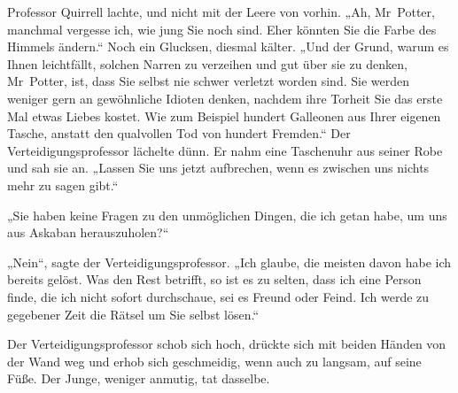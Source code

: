 Professor Quirrell lachte, und nicht mit der Leere von vorhin. „Ah, Mr~Potter, manchmal vergesse ich, wie jung Sie noch sind. Eher könnten Sie die Farbe des Himmels ändern.“ Noch ein Glucksen, diesmal kälter. „Und der Grund, warum es Ihnen leichtfällt, solchen Narren zu verzeihen und gut über sie zu denken, Mr~Potter, ist, dass Sie selbst nie schwer verletzt worden sind. Sie werden weniger gern an gewöhnliche Idioten denken, nachdem ihre Torheit Sie das erste Mal etwas Liebes kostet. Wie zum Beispiel hundert Galleonen aus Ihrer eigenen Tasche, anstatt den qualvollen Tod von hundert Fremden.“ Der Verteidigungsprofessor lächelte dünn. Er nahm eine Taschenuhr aus seiner Robe und sah sie an. „Lassen Sie uns jetzt aufbrechen, wenn es zwischen uns nichts mehr zu sagen gibt.“

„Sie haben keine Fragen zu den unmöglichen Dingen, die ich getan habe, um uns aus Askaban herauszuholen?“

„Nein“, sagte der Verteidigungsprofessor. „Ich glaube, die meisten davon habe ich bereits gelöst. Was den Rest betrifft, so ist es zu selten, dass ich eine Person finde, die ich nicht sofort durchschaue, sei es Freund oder Feind. Ich werde zu gegebener Zeit die Rätsel um Sie selbst lösen.“

Der Verteidigungsprofessor schob sich hoch, drückte sich mit beiden Händen von der Wand weg und erhob sich geschmeidig, wenn auch zu langsam, auf seine Füße. Der Junge, weniger anmutig, tat dasselbe.

